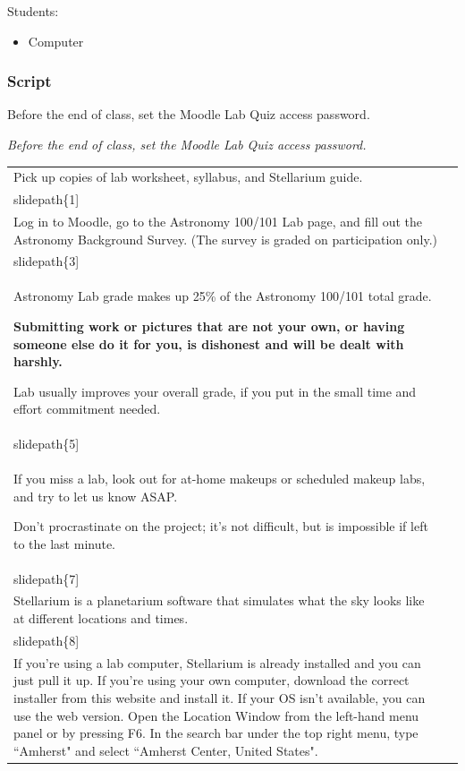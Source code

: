 \documentclass[12pt]{article}
\begin{document}
\noindent
Students:
\begin{itemize}
\item Computer
\end{itemize}


\subsubsection{Script}

Before the end of class, set the Moodle Lab Quiz access password.

\renewcommand\slidepath[1]{ppt/lab01/Slide#1.jpeg}

\emph{Before the end of class, set the Moodle Lab Quiz access password.}

\begin{longtable}{|m{}|m{}|}\hline
Pick up copies of lab worksheet, syllabus, and Stellarium guide. & \texttt{[image: \\slidepath\{1]}}\\\hline
Log in to Moodle, go to the Astronomy 100/101 Lab page, and fill out the Astronomy Background Survey. (The survey is graded on participation only.) & \texttt{[image: \\slidepath\{3]}}\\\hline
Astronomy Lab grade makes up 25\% of the Astronomy 100/101 total grade.

\textbf{Submitting work or pictures that are not your own, or having someone else do it for you, is dishonest and will be dealt with harshly.}

Lab usually improves your overall grade, if you put in the small time and effort commitment needed. & \texttt{[image: \\slidepath\{5]}}\\\hline
If you miss a lab, look out for at-home makeups or scheduled makeup labs, and try to let us know ASAP.

Don't procrastinate on the project; it's not difficult, but is impossible if left to the last minute. & \texttt{[image: \\slidepath\{7]}}\\\hline
Stellarium is a planetarium software that simulates what the sky looks like at different locations and times. & \texttt{[image: \\slidepath\{8]}}\\\hline
If you're using a lab computer, Stellarium is already installed and you can just pull it up. If you're using your own computer, download the correct installer from this website and install it. If your OS isn't available, you can use the web version. Open the Location Window from the left-hand menu panel or by pressing F6. In the search bar under the top right menu, type ``Amherst" and select ``Amherst Center, United States".


\end{longtable}
\end{document}
